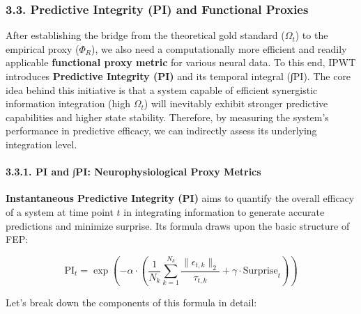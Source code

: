\documentclass[
  a4paper]{article}
\begin{document}
\subsubsection{3.3. Predictive Integrity (PI) and Functional
Proxies}\label{predictive-integrity-pi-and-functional-proxies}

After establishing the bridge from the theoretical gold standard
(\(\Omega_t\)) to the empirical proxy (\(\Phi_R\)), we also need a
computationally more efficient and readily applicable \textbf{functional
proxy metric} for various neural data. To this end, IPWT introduces
\textbf{Predictive Integrity (PI)} and its temporal integral (∫PI). The
core idea behind this initiative is that a system capable of efficient
synergistic information integration (high \(\Omega_t\)) will inevitably
exhibit stronger predictive capabilities and higher state stability.
Therefore, by measuring the system's performance in predictive efficacy,
we can indirectly assess its underlying integration level.

\paragraph{3.3.1. PI and ∫PI: Neurophysiological Proxy
Metrics}\label{pi-and-pi-neurophysiological-proxy-metrics}

\textbf{Instantaneous Predictive Integrity (PI)} aims to quantify the
overall efficacy of a system at time point \(t\) in integrating
information to generate accurate predictions and minimize surprise. Its
formula draws upon the basic structure of FEP:

\[
\mathrm{PI}_t = \exp\left(-\alpha \cdot \left( \frac{1}{N_k} \sum_{k=1}^{N_k} \frac{\|\epsilon_{t,k}\|_2}{\tau_{t,k}} + \gamma \cdot \text{Surprise}_{t} \right)\right)
\]

Let's break down the components of this formula in detail:
\end{document}
